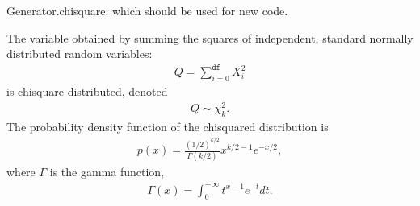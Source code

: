 \documentclass[letterpaper,10pt,english]{sphinxmanual}
\begin{document}
\begin{fulllineitems}
\begin{description}
\end{description}

Generator.chisquare: which should be used for new code.

The variable obtained by summing the squares of  independent,
standard normally distributed random variables:
\begin{equation*}
\begin{split}Q = \sum_{i=0}^{\mathtt{df}} X^2_i\end{split}
\end{equation*}
is chi\sphinxhyphen{}square distributed, denoted
\begin{equation*}
\begin{split}Q \sim \chi^2_k.\end{split}
\end{equation*}
The probability density function of the chi\sphinxhyphen{}squared distribution is
\begin{equation*}
\begin{split}p(x) = \frac{(1/2)^{k/2}}{\Gamma(k/2)}
x^{k/2 - 1} e^{-x/2},\end{split}
\end{equation*}
where \(\Gamma\) is the gamma function,
\begin{equation*}
\begin{split}\Gamma(x) = \int_0^{-\infty} t^{x - 1} e^{-t} dt.\end{split}
\end{equation*}
\begin{sphinxVerbatim}[commandchars=\\\{\}]
\end{sphinxVerbatim}

\end{fulllineitems}

\end{document}
